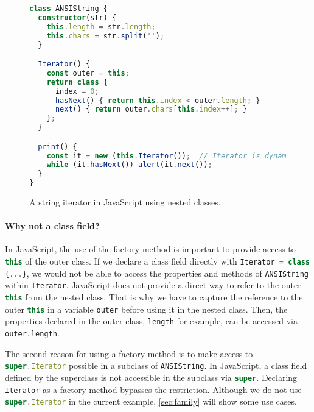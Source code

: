 \begin{figure}
\begin{lstlisting}[language=TypeScript]
class ANSIString {
  constructor(str) {
    this.length = str.length;
    this.chars = str.split('');
  }

  Iterator() {
    const outer = this;
    return class {
      index = 0;
      hasNext() { return this.index < outer.length; }
      next() { return outer.chars[this.index++]; }
    };
  }

  print() {
    const it = new (this.Iterator());  // Iterator is dynamically bound.
    while (it.hasNext()) alert(it.next());
  }
}
\end{lstlisting}
\caption{A string iterator in JavaScript using nested classes.}
\label{fig:string_it}
\end{figure}

\paragraph{Why not a class field?}
In JavaScript, the use of the factory method is important to provide access to
\lstinline[language=TypeScript]{this} of the outer class. If we declare a class
field directly with \lstinline[language=TypeScript]|Iterator = class {...}|, we
would not be able to access the properties and methods of \lstinline{ANSIString}
within \lstinline{Iterator}. JavaScript does not provide a direct way to refer
to the outer \lstinline[language=TypeScript]{this} from the nested class. That
is why we have to capture the reference to the outer
\lstinline[language=TypeScript]{this} in a variable \lstinline{outer} before
using it in the nested class. Then, the properties declared in the outer class,
\lstinline{length} for example, can be accessed via \lstinline{outer.length}.

The second reason for using a factory method is to make access to
\lstinline[language=TypeScript]{super.Iterator} possible in a subclass of
\lstinline{ANSIString}. In JavaScript, a class field defined by the superclass
is not accessible in the subclass via \lstinline[language=TypeScript]{super}.
Declaring \lstinline{Iterator} as a factory method bypasses the restriction.
Although we do not use \lstinline[language=TypeScript]{super.Iterator} in the
current example, \autoref{sec:family} will show some use cases.

